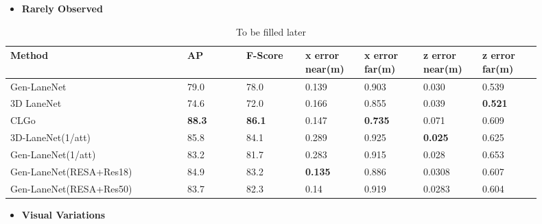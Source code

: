     \begin{itemize}
        \item \textbf{Rarely Observed}
    \end{itemize}
    
        \begin{table}[htbp]
    \centering
    \caption{To be filled later}
    \begin{tabular}{|p{0.3\linewidth}|p{0.1\linewidth}|p{0.1\linewidth}|p{0.1\linewidth}|p{0.1\linewidth}|p{0.1\linewidth}|p{0.1\linewidth}|}
    \hline
        \textbf{Method} & \textbf{AP} & \textbf{F-Score} & \textbf{x error near(m)} & \textbf{x error far(m)} & \textbf{z error near(m)} & \textbf{z error far(m)} \\ \hline
        Gen-LaneNet & 79.0 & 78.0 & 0.139 & 0.903 & 0.030 & 0.539 \\ \hline
        3D LaneNet & 74.6 & 72.0 & 0.166 & 0.855 & 0.039 &\textbf{ 0.521} \\ \hline
        CLGo &\textbf{ 88.3} &\textbf{ 86.1} & 0.147 & \textbf{0.735} & 0.071 & 0.609 \\ \hline
        3D-LaneNet(1/att) & 85.8 & 84.1 & 0.289 & 0.925 &\textbf{ 0.025} & 0.625 \\ \hline
        Gen-LaneNet(1/att) & 83.2 & 81.7 & 0.283 & 0.915 & 0.028 & 0.653 \\ \hline
        Gen-LaneNet(RESA+Res18) &  84.9 & 83.2 &\textbf{ 0.135} & 0.886 & 0.0308 & 0.607 \\ \hline
        Gen-LaneNet(RESA+Res50) & 83.7 & 82.3 & 0.14 & 0.919 & 0.0283 & 0.604 \\ \hline
    \end{tabular}
\end{table}

  \begin{itemize}
        \item \textbf{Visual Variations}
    \end{itemize}
    
